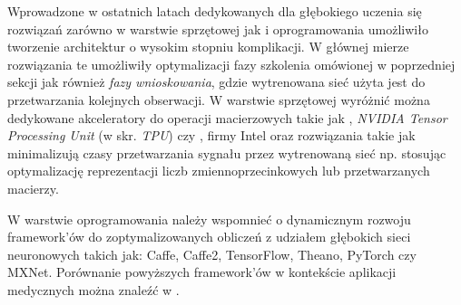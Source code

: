Wprowadzone w ostatnich latach dedykowanych dla głębokiego uczenia się rozwiązań zarówno w warstwie sprzętowej jak i oprogramowania umożliwiło tworzenie architektur o wysokim stopniu komplikacji. W głównej mierze rozwiązania te umożliwiły optymalizacji fazy szkolenia omówionej w poprzedniej sekcji jak również \textit{fazy wnioskowania}, gdzie wytrenowana sieć użyta jest do przetwarzania kolejnych obserwacji. W warstwie sprzętowej  wyróżnić można dedykowane akceleratory do operacji macierzowych takie jak \cite{DBLP:journals/corr/abs-1803-04014}, \textit{NVIDIA Tensor Processing Unit} (w skr. \textit{TPU}) czy \cite{Intel}, firmy Intel oraz rozwiązania takie jak \cite{TensorRT} minimalizują czasy przetwarzania sygnału przez wytrenowaną sieć np. stosując optymalizację reprezentacji liczb zmiennoprzecinkowych lub przetwarzanych macierzy. 

W warstwie oprogramowania należy wspomnieć o dynamicznym rozwoju framework'ów do zoptymalizowanych obliczeń z udziałem głębokich sieci neuronowych takich jak: Caffe, Caffe2, TensorFlow, Theano, PyTorch czy MXNet. Porównanie powyższych framework'ów w kontekście aplikacji medycznych można znaleźć w \cite{Erickson2017}.

